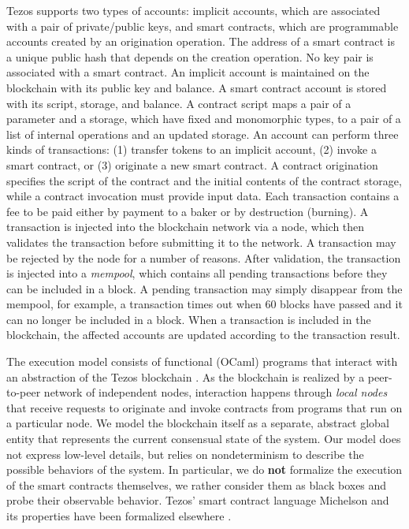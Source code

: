 \documentclass[runningheads]{llncs}
\begin{document}
Tezos supports two types of accounts: implicit accounts, which
are associated with a pair of private/public keys, and smart
contracts, which are programmable accounts created by an origination
operation. The address of a smart
contract is a unique public hash that depends on the creation
operation. No key pair is associated with a smart contract. An
implicit account is maintained on the blockchain with 
its public key and balance.
A smart contract account is stored with its script, storage,
and balance. A contract script maps a pair of a parameter and a
storage, which have fixed and monomorphic types, to a pair of a list of
internal operations and an updated storage. An account can
perform three kinds of transactions: (1) transfer tokens to an
implicit account, (2) invoke a smart contract, or (3) originate a new
smart contract. A contract origination specifies the script of the
contract and the initial contents of the contract storage, while a
contract invocation must provide input data. Each transaction contains
a fee to be paid either by payment to a baker or by destruction
(burning). A transaction is injected into the blockchain network via a
node, which then validates the transaction before submitting it to the
network. A transaction may be rejected by the node for a
number of reasons. After validation, the transaction is injected into
a \emph{mempool}, which contains all pending transactions before they can
be included in a block. A pending transaction may simply disappear
from the mempool, for example, a transaction times out when 60 blocks
have passed and it can no longer be included in a block. When a transaction
is included in the blockchain, the affected accounts are updated
according to the transaction result.  


The execution model consists of functional (OCaml) programs that
interact with an abstraction of the Tezos blockchain
\cite{tezos-whitepaper}. As the blockchain is realized by a
peer-to-peer network of 
independent nodes, interaction happens through
\emph{local nodes} that receive requests to originate and invoke
contracts from programs that run on a particular node. We model the blockchain
itself as a separate, abstract global entity that represents the
current consensual state of the system. Our model does not express
low-level details, but relies on nondeterminism to describe
the possible behaviors of the system. In particular, we do
\textbf{not} formalize the execution of the smart contracts
themselves, we rather consider them as black boxes and probe their
observable behavior. Tezos' smart contract language Michelson and its
properties have been formalized elsewhere \cite{DBLP:conf/fm/BernardoCHPT19}.
\end{document}
